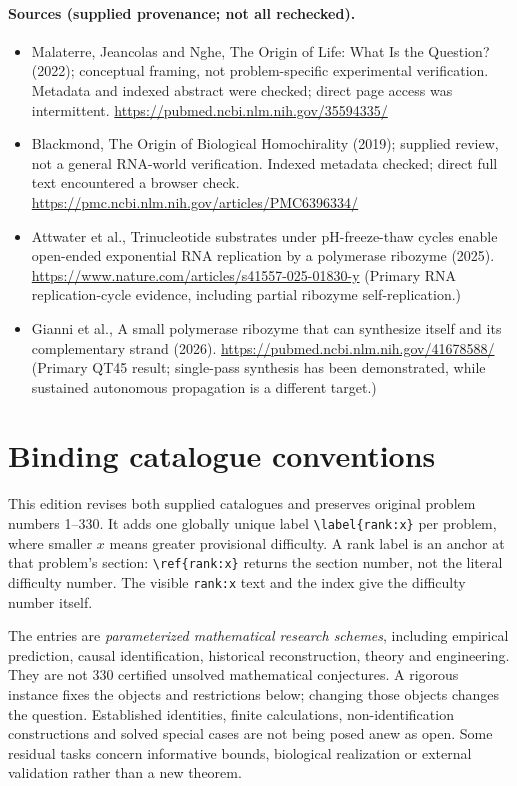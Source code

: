 \documentclass[11pt]{article}
\begin{document}
\paragraph{Sources (supplied provenance; not all rechecked).} \begin{itemize}
\item Malaterre, Jeancolas and Nghe, The Origin of Life: What Is the Question? (2022); conceptual framing, not problem-specific experimental verification. Metadata and indexed abstract were checked; direct page access was intermittent. \url{https://pubmed.ncbi.nlm.nih.gov/35594335/}
\item Blackmond, The Origin of Biological Homochirality (2019); supplied review, not a general RNA-world verification. Indexed metadata checked; direct full text encountered a browser check. \url{https://pmc.ncbi.nlm.nih.gov/articles/PMC6396334/}
\item Attwater et al., Trinucleotide substrates under pH-freeze-thaw cycles enable open-ended exponential RNA replication by a polymerase ribozyme (2025). \url{https://www.nature.com/articles/s41557-025-01830-y} (Primary RNA replication-cycle evidence, including partial ribozyme self-replication.)
\item Gianni et al., A small polymerase ribozyme that can synthesize itself and its complementary strand (2026). \url{https://pubmed.ncbi.nlm.nih.gov/41678588/} (Primary QT45 result; single-pass synthesis has been demonstrated, while sustained autonomous propagation is a different target.)
\end{itemize}


\section*{Binding catalogue conventions}
This edition revises both supplied catalogues and preserves original problem numbers 1--330. It adds one globally unique label \verb|\label{rank:x}| per problem, where smaller $x$ means greater provisional difficulty. A rank label is an anchor at that problem's section: \verb|\ref{rank:x}| returns the section number, not the literal difficulty number. The visible \texttt{rank:x} text and the index give the difficulty number itself.

The entries are \emph{parameterized mathematical research schemes}, including empirical prediction, causal identification, historical reconstruction, theory and engineering. They are not 330 certified unsolved mathematical conjectures. A rigorous instance fixes the objects and restrictions below; changing those objects changes the question. Established identities, finite calculations, non-identification constructions and solved special cases are not being posed anew as open. Some residual tasks concern informative bounds, biological realization or external validation rather than a new theorem.
\end{document}
